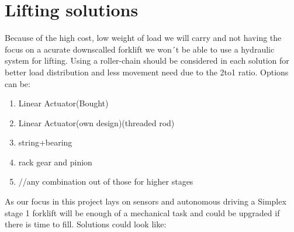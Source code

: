 \documentclass[11pt]{article}
\begin{document}
\section{Lifting solutions}
Because of the high cost, low weight of load we will carry and not having the focus on a acurate downscalled 
forklift we won´t be able to use a hydraulic system for lifting.
Using a roller-chain should be considered in each solution for better load distribution and less movement need due to the 2to1
ratio.
Options can be:
\begin{enumerate}
    \item Linear Actuator(Bought)
    \item Linear Actuator(own design)(threaded rod)
    \item string+bearing 
    \item rack gear and pinion
    \item //any combination out of those for higher stages
\end{enumerate}
As our focus in this project lays on sensors and autonomous driving a Simplex stage 1 forklift will be enough of a mechanical 
task and could be upgraded if there is time to fill. 
Solutions could look like:
\end{document}
